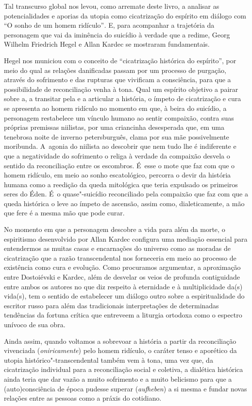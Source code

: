 Tal transcurso global nos levou, como arremate deste livro, a analisar
as potencialidades e aporias da utopia como cicatrização do espírito em
diálogo com ``O sonho de um homem ridículo''\emph{.} E, para acompanhar
a trajetória da personagem que vai da iminência do suicídio à verdade
que a redime, Georg Wilhelm Friedrich Hegel e Allan Kardec se mostraram
fundamentais.

Hegel nos municiou com o conceito de ``cicatrização histórica do
espírito'', por meio do qual as relações danificadas passam por um
processo de purgação, através do sofrimento e das rupturas que vivificam
a consciência, para que a possibilidade de reconciliação venha à tona.
Qual um espírito objetivo a pairar sobre a, a transitar pela e a
articular a história, o ímpeto de cicatrização e cura se apresenta ao
homem ridículo no momento em que, à beira do suicídio, a personagem
restabelece um vínculo humano ao sentir compaixão, contra suas próprias
premissas niilistas, por uma criancinha desesperada que, em uma
tenebrosa noite de inverno petersburguês, clama por sua mãe
possivelmente moribunda. A~agonia do niilista ao descobrir que nem tudo
lhe é indiferente e que a negatividade do sofrimento o religa à verdade
da compaixão desvela o sentido da reconciliação entre os escombros. É~esse
o mote que faz com que o homem ridículo, em meio ao sonho
escatológico, percorra o devir da história humana como a reedição da
queda mitológica que teria expulsado os primeiros seres do Éden. É~o
quase"-suicídio reconciliado pela compaixão que faz com que a queda
histórica o leve ao ímpeto de ascensão, assim como, dialeticamente, a
mão que fere é a mesma mão que pode curar.

No momento em que a personagem descobre a vida para além da morte, o
espiritismo desenvolvido por Allan Kardec configura uma mediação
essencial para entendermos as muitas casas e encarnações do universo
como as moradas de cicatrização que a razão transcendental nos
forneceria em meio ao processo de existência como cura e evolução. Como
procuramos argumentar, a aproximação entre Dostoiévski e Kardec, além de
desvelar os veios de profunda contiguidade entre ambos os autores no que
diz respeito à eternidade e à multiplicidade da(s) vida(s), tem o
sentido de estabelecer um diálogo outro sobre a espiritualidade do
escritor russo para além das tradicionais interpretações de determinadas
tendências da fortuna crítica que entreveem a liturgia ortodoxa como o
espectro unívoco de sua obra.

Ainda assim, quando voltamos a sobrevoar a história a partir da
reconciliação vivenciada (\emph{oniricamente}) pelo homem ridículo, o
caráter tenso e aporético da utopia histórico"-transcendental também vem
à tona, uma vez que, da cicatrização individual para a reconciliação
social e coletiva, a dialética histórica ainda teria que dar vazão a
muito sofrimento e a muito belicismo para que a (auto)consciência de
época pudesse superar (\emph{aufheben}) a si mesma e fundar novas
relações entre as pessoas como a práxis do cotidiano.

